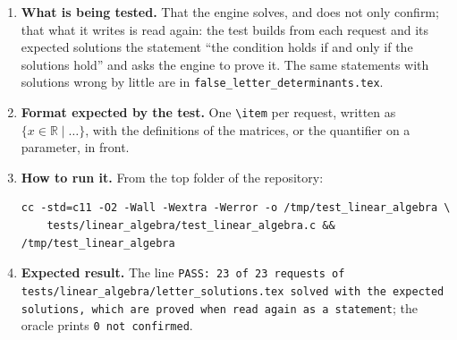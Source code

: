 \documentclass[11pt,a4paper]{article}
\begin{document}
\begin{enumerate}
\item \textbf{What is being tested.} That the engine solves, and does not only confirm; that what it writes is read again: the test builds from each request and its expected solutions the statement ``the condition holds if and only if the solutions hold'' and asks the engine to prove it. The same statements with solutions wrong by little are in \texttt{false\_letter\_determinants.tex}.

\item \textbf{Format expected by the test.} One \texttt{\textbackslash item} per request, written as $\{x \in \mathbb{R} \mid \ldots\}$, with the definitions of the matrices, or the quantifier on a parameter, in front.

\item \textbf{How to run it.} From the top folder of the repository:
\begin{verbatim}
cc -std=c11 -O2 -Wall -Wextra -Werror -o /tmp/test_linear_algebra \
    tests/linear_algebra/test_linear_algebra.c && /tmp/test_linear_algebra
\end{verbatim}

\item \textbf{Expected result.} The line \texttt{PASS: 23 of 23 requests of tests/linear\_algebra/letter\_solutions.tex solved with the expected solutions, which are proved when read again as a statement}; the oracle prints \texttt{0 not confirmed}.
\end{enumerate}
\end{document}

